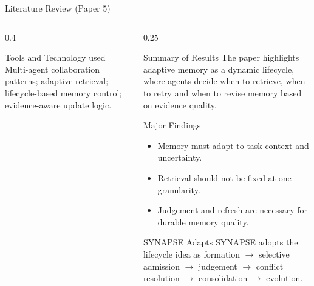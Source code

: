 \begin{frame}{Literature Review (Paper 5)}
\begin{columns}[T]
\begin{column}{0.4\textwidth}
    \begin{block}{Tools and Technology used}
      \tiny Multi-agent collaboration patterns; adaptive retrieval; lifecycle-based memory control; evidence-aware update logic.
    \end{block}
  \end{column}

  \begin{column}{0.25\textwidth}
    \begin{block}{Summary of Results}
      \tiny The paper highlights adaptive memory as a dynamic lifecycle, where agents decide when to retrieve, when to retry and when to revise memory based on evidence quality.
    \end{block}
    \vspace{0.12cm}
    \begin{block}{Major Findings}
      \tiny
      \begin{itemize}\setlength\itemsep{1pt}
      \item Memory must adapt to task context and uncertainty.
\item Retrieval should not be fixed at one granularity.
\item Judgement and refresh are necessary for durable memory quality.
      \end{itemize}
    \end{block}
    \begin{alertblock}{SYNAPSE Adapts}
      \tiny SYNAPSE adopts the lifecycle idea as formation $\rightarrow$ selective admission $\rightarrow$ judgement $\rightarrow$ conflict resolution $\rightarrow$ consolidation $\rightarrow$ evolution.
    \end{alertblock}
  \end{column}
  \end{columns}
\end{frame}
